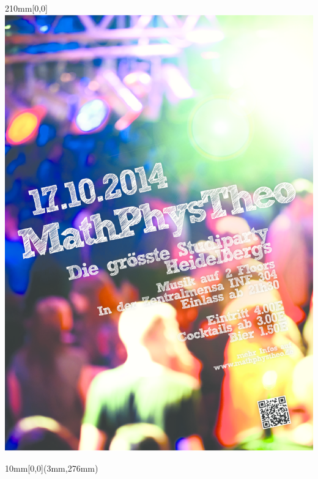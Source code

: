 \documentclass[a4paper]{memoir}
\begin{document}
\begin{textblock*}{210mm}[0,0]
{        \href{http://mathphystheo.de}{\includegraphics[width=217mm]{cover/festplakat_rgb}} %
    }
\end{textblock*}

\begin{textblock*}{10mm}[0,0](3mm,276mm)
\end{textblock*}
\end{document}
